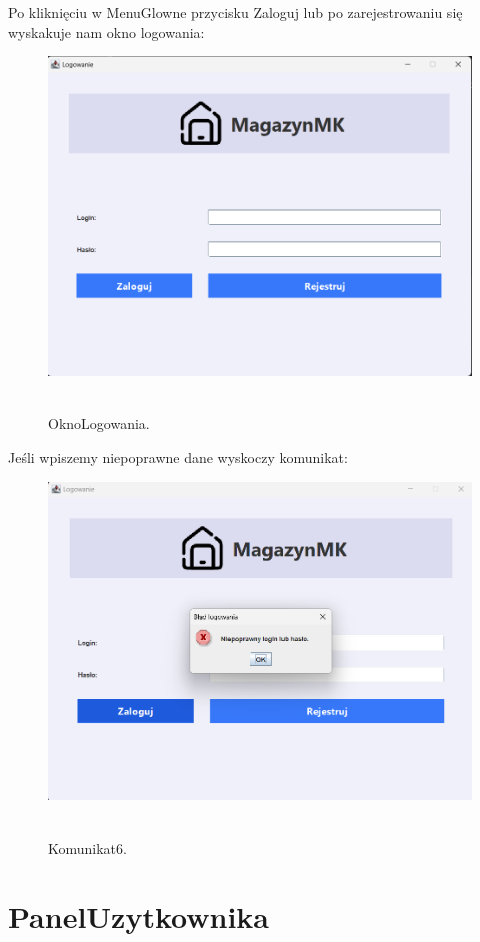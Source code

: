 Po kliknięciu w MenuGlowne przycisku Zaloguj lub po zarejestrowaniu się wyskakuje nam okno logowania:

\begin{figure}[H]
    \centering
    \includegraphics[width=.9\linewidth]{figures/OknoLogowania.png}\
    \caption{OknoLogowania.\label{OknoLogowania}}
\end{figure}

Jeśli wpiszemy niepoprawne dane wyskoczy komunikat:

\begin{figure}[H]
    \centering
    \includegraphics[width=.9\linewidth]{figures/LogowanieKomunikat.png}\
    \caption{Komunikat6.\label{Komunikat6}}
\end{figure}

\section{PanelUzytkownika}
\label{sec:PanelUzytkownika}

